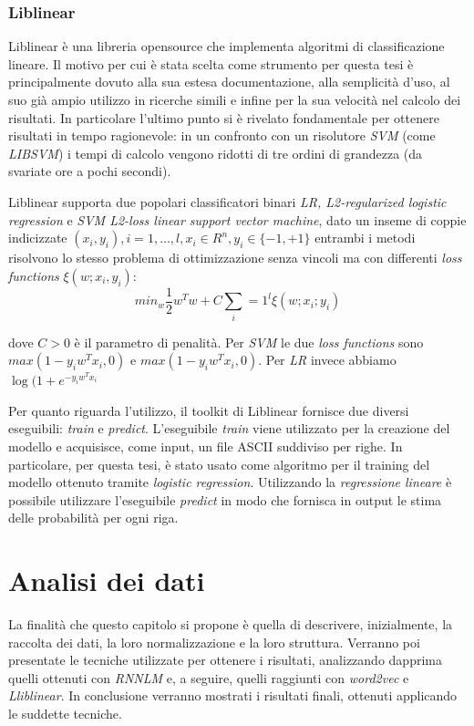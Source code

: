\documentclass[a4paper,12pt,openright,twoside]{report}
\theoremstyle{definition}
\begin{document}
\subsection{Liblinear}
Liblinear è una libreria opensource che implementa algoritmi di classificazione lineare. Il motivo
per cui è stata scelta come strumento per questa
tesi è principalmente dovuto alla sua estesa documentazione, alla semplicità
d'uso, al suo già ampio utilizzo in ricerche simili e infine per la sua velocità nel calcolo dei risultati. 
In particolare l'ultimo punto si è rivelato fondamentale
per ottenere risultati in tempo ragionevole: in un confronto con un risolutore \emph{SVM} (come \emph{LIBSVM})
i tempi di calcolo vengono ridotti di tre ordini di grandezza (da svariate ore a pochi secondi).

Liblinear supporta due popolari classificatori binari \emph{LR, L2-regularized logistic regression} e 
\emph{SVM L2-loss linear support vector machine}, dato un inseme di coppie
indicizzate $(x_i,y_i),i=1,\dots{},l,x_i\in R^n, y_i \in \{-1,+1\}$ entrambi i metodi risolvono lo stesso
problema di ottimizzazione senza vincoli ma con differenti \emph{loss functions} $\xi(w;x_i,y_i)$:
\begin{equation}
	min_w \frac{1}{2}w^Tw+C\sum_i=1^l\xi(w;x_i;y_i)
	\label{eqn:liblinear1}
\end{equation}

dove $C > 0$ è il parametro di penalità. Per \emph{SVM} le due \emph{loss functions} sono $max(1-y_iw^Tx_i,0)$ e
$max(1-y_iw^Tx_i,0)$. Per \emph{LR} invece abbiamo $\log(1+e^{-y_iw^Tx_i}$

Per quanto riguarda l'utilizzo, il toolkit di Liblinear fornisce due diversi eseguibili: \emph{train} e 
\emph{predict}.
L'eseguibile \emph{train} viene utilizzato per la creazione del modello e acquisisce, come input, un file
ASCII suddiviso per righe. In particolare, per questa tesi, è stato usato come algoritmo 
per il training del modello ottenuto tramite \emph{logistic regression}.
Utilizzando la \emph{regressione lineare} è possibile utilizzare l'eseguibile \emph{predict} in modo 
che fornisca in output le stima delle probabilità per ogni riga.

\chapter{Analisi dei dati}
La finalità che questo capitolo si propone è quella di descrivere, inizialmente, la raccolta dei dati, 
la loro normalizzazione e la loro struttura. 
Verranno poi presentate le tecniche utilizzate per ottenere i risultati, 
analizzando dapprima quelli ottenuti con  \emph{RNNLM}
 e, a seguire, quelli raggiunti con \emph{word2vec} e \emph{Lliblinear}.
 In conclusione verranno mostrati i risultati finali, ottenuti applicando le suddette tecniche.
\end{document}
